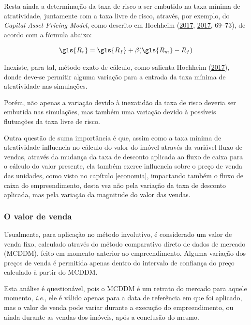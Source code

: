 \documentclass[
	12pt,				%
	oneside,			%
	a4paper,			%
	chapter=TITLE,		%
	section=TITLE,		%
	english,			%
	brazil				%
	]{abntex2}
\begin{document}
Resta ainda a determinação da taxa de risco a ser embutido na taxa mínima de
atratividade, juntamente com a taxa livre de risco, através, por exemplo, do
\emph{Capital Asset Pricing Model}, como descrito em Hochheim (\protect\hyperlink{ref-gahochheim}{2017}, \protect\hyperlink{ref-gahochheim}{2017}, 69--73),
de acordo com a fórmula abaixo:

\[\gls{R_e}= \gls{R_f} + \beta(\gls{R_m} - R_f)\]

Inexiste, para tal, método exato de cálculo, como salienta Hochheim (\protect\hyperlink{ref-gahochheim}{2017}), donde
deve-se permitir alguma variação para a entrada da taxa mínima de atratividade
nas simulações.

Porém, não apenas a variação devido à inexatidão da taxa de risco deveria
ser embutida nas simulações, mas também uma variação devido à possíveis
flutuações da taxa livre de risco.

Outra questão de suma importância é que, assim como a taxa mínima de
atratividade influencia no cálculo do valor do imóvel através da variável fluxo
de vendas, através da mudança da taxa de desconto aplicada ao fluxo de caixa
para o cálculo do valor presente, ela também exerce influencia sobre o preço de
venda das unidades, como visto no capítulo \ref{economia}, impactando também o
fluxo de caixa do empreendimento, desta vez não pela variação da taxa de
desconto aplicada, mas pela variação da magnitude do valor das vendas.

\hypertarget{o-valor-de-venda}{%
\subsubsection{O valor de venda}\label{o-valor-de-venda}}

Usualmente, para aplicação no método involutivo, é considerado um valor de venda
fixo, calculado através do método comparativo direto de dados de mercado
(MCDDM), feito em momento anterior ao empreendimento. Alguma variação dos preços
de venda é permitida apenas dentro do intervalo de confiança do preço calculado
à partir do MCDDM.

Esta análise é questionável, pois o MCDDM é um retrato do mercado para aquele
momento, \emph{i.e.}, ele é válido apenas para a data de referência em que foi
aplicado, mas o valor de venda pode variar durante a execução do empreendimento,
ou ainda durante as vendas dos imóveis, após a conclusão do mesmo.
\end{document}
